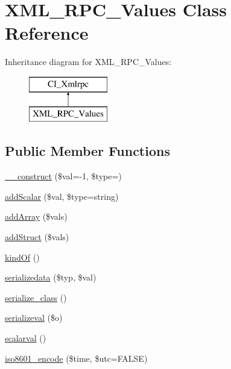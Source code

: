 \hypertarget{class_x_m_l___r_p_c___values}{}\section{X\+M\+L\+\_\+\+R\+P\+C\+\_\+\+Values Class Reference}
\label{class_x_m_l___r_p_c___values}
Inheritance diagram for X\+M\+L\+\_\+\+R\+P\+C\+\_\+\+Values\+:\begin{figure}[H]
\begin{center}
\leavevmode
\includegraphics[height=2.000000cm]{class_x_m_l___r_p_c___values}
\end{center}
\end{figure}
\subsection*{Public Member Functions}
\begin{DoxyCompactItemize}
\item 
\mbox{\hyperlink{class_x_m_l___r_p_c___values_aba787096f38355cb9b68a2f4e71dcdc7}{\+\_\+\+\_\+construct}} (\$val=-\/1, \$type=\textquotesingle{}\textquotesingle{})
\item 
\mbox{\hyperlink{class_x_m_l___r_p_c___values_a230be00e25acc82438e373ef188e4202}{add\+Scalar}} (\$val, \$type=\textquotesingle{}string\textquotesingle{})
\item 
\mbox{\hyperlink{class_x_m_l___r_p_c___values_aaffa8c37678f992c062e1de2f0442460}{add\+Array}} (\$vals)
\item 
\mbox{\hyperlink{class_x_m_l___r_p_c___values_aea54f6086f1cc9622f50dcd90a3a64d2}{add\+Struct}} (\$vals)
\item 
\mbox{\hyperlink{class_x_m_l___r_p_c___values_a9daa1f725059a6618ded9e59b2188793}{kind\+Of}} ()
\item 
\mbox{\hyperlink{class_x_m_l___r_p_c___values_a53c5baae3f4bc1089dfe5f2967c2ef1a}{serializedata}} (\$typ, \$val)
\item 
\mbox{\hyperlink{class_x_m_l___r_p_c___values_a23f9f904e58930e3f3ea0f25d0d50d8f}{serialize\+\_\+class}} ()
\item 
\mbox{\hyperlink{class_x_m_l___r_p_c___values_abd92892449f7572e9ed8eac041b2acda}{serializeval}} (\$o)
\item 
\mbox{\hyperlink{class_x_m_l___r_p_c___values_a44612d1c7abce23c41652478de1001ac}{scalarval}} ()
\item 
\mbox{\hyperlink{class_x_m_l___r_p_c___values_a089ae76d71c66d3a7c4f19f0b5890ec5}{iso8601\+\_\+encode}} (\$time, \$utc=F\+A\+L\+SE)
\end{DoxyCompactItemize}
